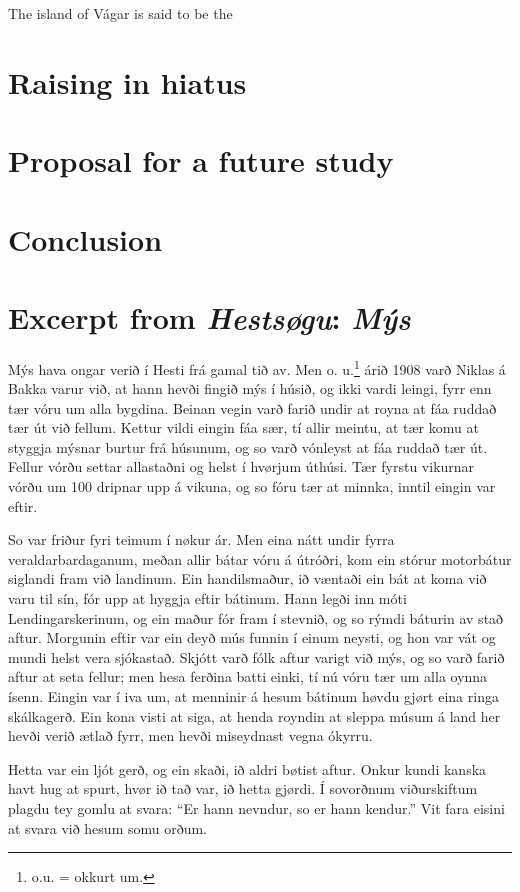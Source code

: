 \documentclass[a4paper]{article}
\begin{document}
The island of Vágar is said to be the 

\section{Raising in hiatus}

\section{Proposal for a future study}

\section{Conclusion}

\appendix
\section{Excerpt from \textit{Hestsøgu}: \textit{Mýs} \parencite[177]{lockwood:02}}\label{app:readingtext}

Mýs hava ongar verið í Hesti frá gamal tið av. Men o. u.\footnote{o.u. = okkurt um.} árið 1908 varð Niklas á Bakka varur við, at hann hevði fingið mýs í húsið, og ikki vardi leingi, fyrr enn tær vóru um alla bygdina. Beinan vegin varð farið undir at royna at fáa ruddað tær út við fellum. Kettur vildi eingin fáa sær, tí allir meintu, at tær komu at styggja mýsnar burtur frá húsunum, og so varð vónleyst at fáa ruddað tær út. Fellur vórðu settar allastaðni og helst í hvørjum úthúsi. Tær fyrstu vikurnar vórðu um 100 dripnar upp á vikuna, og so fóru tær at minnka, inntil eingin var eftir.

So var friður fyri teimum í nøkur ár. Men eina nátt undir fyrra veraldarbardaganum, meðan allir bátar vóru á útróðri, kom ein stórur motorbátur siglandi fram við landinum. Ein handilsmaður, ið væntaði ein bát at koma við varu til sín, fór upp at hyggja eftir bátinum. Hann legði inn móti Lendingarskerinum, og ein maður fór fram í stevnið, og so rýmdi báturin av stað aftur. Morgunin eftir var ein deyð mús funnin í einum neysti, og hon var vát og mundi helst vera sjókastað. Skjótt varð fólk aftur varigt við mýs, og so varð farið aftur at seta fellur; men hesa ferðina batti einki, tí nú vóru tær um alla oynna ísenn. Eingin var í iva um, at menninir á hesum bátinum høvdu gjørt eina ringa skálkagerð. Ein kona visti at siga, at henda royndin at sleppa músum á land her hevði verið ætlað fyrr, men hevði miseydnast vegna ókyrru.

Hetta var ein ljót gerð, og ein skaði, ið aldri bøtist aftur. Onkur kundi kanska havt hug at spurt, hvør ið tað var, ið hetta gjørdi. Í sovorðnum viðurskiftum plagdu tey gomlu at svara: ``Er hann nevndur, so er hann kendur.'' Vit fara eisini at svara við hesum somu orðum.

\nocite{*}

\printbibliography
\end{document}
